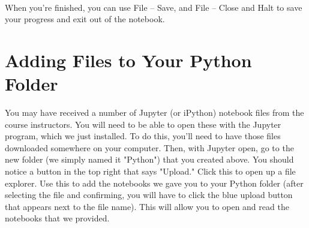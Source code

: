 \documentclass[]{article}
\begin{document}
\paragraph{}
When you're finished, you can use File -- Save, and File -- Close and Halt to save your progress and exit out of the notebook.

\newpage
\section*{Adding Files to Your Python Folder}
You may have received a number of Jupyter (or iPython) notebook files from the course instructors. You will need to be able to open these with the Jupyter program, which we just installed. To do this, you'll need to have those files downloaded somewhere on your computer. Then, with Jupyter open, go to the new folder (we simply named it "Python") that you created above. You should notice a button in the top right that says "Upload." Click this to open up a file explorer. Use this to add the notebooks we gave you to your Python folder (after selecting the file and confirming, you will have to click the blue upload button that appears next to the file name). This will allow you to open and read the notebooks that we provided.
\end{document}
